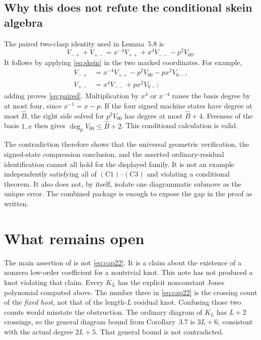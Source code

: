 \documentclass[11pt]{amsart}
\theoremstyle{remark}
\newcommand{\degp}{\deg_p}
\begin{document}
\subsection*{Why this does not refute the conditional skein algebra}

The paired two-clasp identity used in Lemma~5.8 is
\begin{equation}\label{eq:paired}
 V_{-+}+V_{+-}=x^{-4}V_{++}+x^4V_{--}-p^2V_{00}.
\end{equation}
It follows by applying \eqref{eq:skein} in
the two marked coordinates. For example,
\begin{align*}
 V_{-+}&=x^{-4}V_{++}-p^2V_{00}-px^2V_{0-},\\
 V_{+-}&=x^4V_{--}+px^2V_{0-};
\end{align*}
adding proves \eqref{eq:paired}.
Multiplication by \(x^{4}\) or \(x^{-4}\)
raises the basis degree by at most four,
since \(x^{-1}=x-p\).
If the four signed machine states have degree
at most \(\widehat B\), the right side solved
for \(p^2V_{00}\) has degree at most
\(\widehat B+4\). Freeness of the basis \(1,x\)
then gives \(\degp V_{00}\le\widehat B+2\).
This conditional calculation is valid.

The contradiction therefore shows that the
universal geometric verification, the
signed-state compression conclusion, and
the asserted ordinary-residual identification
cannot all hold for the displayed family.
It is not an example independently satisfying
all of \((\mathrm C1)\)--\((\mathrm C3)\)
and violating a conditional theorem.
It also does not, by itself, isolate one
diagrammatic submove as the unique error.
The combined package is enough to expose
the gap in the proof as written.

\section{What remains open}

The main assertion of \cite{CC} is not
\eqref{eq:cap22}. It is a claim about the
existence of a nonzero low-order coefficient
for a nontrivial knot. This note has not
produced a knot violating that claim.
Every \(K_L\) has the explicit nonconstant
Jones polynomial computed above.
The number three in \eqref{eq:cap22}
is the crossing count of the \emph{fixed host},
not that of the length-\(L\) residual knot.
Confusing those two counts would misstate
the obstruction.
The ordinary diagram of \(K_L\) has \(L+2\)
crossings, so the general diagram bound from
Corollary~3.7 is \(3L+6\), consistent with
the actual degree \(2L+5\).
That general bound is not contradicted.
\end{document}
